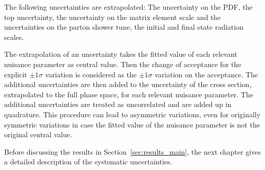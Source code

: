 The following uncertainties are extrapolated:
The uncertainty on the PDF, the top \pt uncertainty, the uncertainty on the matrix element scale and the uncertainties on the parton shower tune, the initial and final state radiation scales.

The extrapolation of an uncertainty takes the fitted value of each relevant nuisance parameter as central value. Then the change of acceptance for the explicit $\pm 1 \sigma$ variation is considered as the $\pm 1 \sigma$ variation on the acceptance. The additional uncertainties are then added to the uncertainty of the cross section, extrapolated to the full phase space, for each relevant nuisance parameter. The additional uncertainties are treated as uncorrelated and are added up in quadrature. This procedure can lead to asymmetric variations, even for originally symmetric variations in case the fitted value of the nuisance parameter is not the original central value.

Before discussing the results in Section~\ref{sec:results_main}, the next chapter gives a detailed description of the systematic uncertainties.

